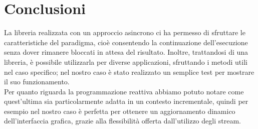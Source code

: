 \documentclass[a4paper,12pt]{report}
\begin{document}
\chapter{Conclusioni}
La libreria realizzata con un approccio asincrono ci ha permesso di sfruttare le caratteristiche del paradigma, cioè consentendo la continuazione dell'esecuzione senza dover rimanere bloccati in attesa del risultato.
Inoltre, trattandosi di una libreria, è possibile utilizzarla per diverse applicazioni, sfruttando i metodi utili nel caso specifico; nel nostro caso è stato realizzato un semplice test per mostrare il suo funzionamento. \\
Per quanto riguarda la programmazione reattiva abbiamo potuto notare come quest'ultima sia particolarmente adatta in un contesto incrementale, quindi per esempio nel nostro caso è perfetta per ottenere un aggiornamento dinamico dell'interfaccia grafica, grazie alla flessibilità offerta dall'utilizzo degli stream.
\end{document}
